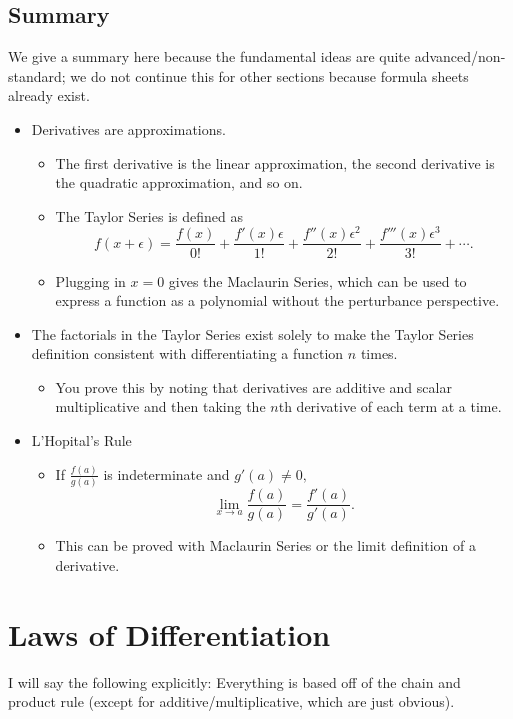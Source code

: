 \documentclass[blue,onecol]{shooting}
\begin{document}
\subsection{Summary}
We give a summary here because the fundamental ideas are quite advanced/non-standard; we do not continue this for other sections because formula sheets already exist. 
\begin{itemize}
\item Derivatives are approximations.
\begin{itemize}
\item The first derivative is the linear approximation, the second derivative is the quadratic approximation, and so on.
\item The Taylor Series is defined as \[f(x+\epsilon)=\frac{f(x)}{0!}+\frac{f'(x)\epsilon}{1!}+\frac{f''(x)\epsilon^2}{2!}+\frac{f'''(x)\epsilon^3}{3!}+\cdots.\]
\item Plugging in $x=0$ gives the Maclaurin Series, which can be used to express a function as a polynomial without the perturbance perspective.
\end{itemize}
\item The factorials in the Taylor Series exist solely to make the Taylor Series definition consistent with differentiating a function $n$ times.
\begin{itemize}
\item You prove this by noting that derivatives are additive and scalar multiplicative and then taking the $n$th derivative of each term at a time.
\end{itemize}
\item L'Hopital's Rule
\begin{itemize}
\item If $\frac{f(a)}{g(a)}$ is indeterminate and $g'(a)\neq 0,$
\[\lim_{x\to a}\frac{f(a)}{g(a)}=\frac{f'(a)}{g'(a)}.\]
\item This can be proved with Maclaurin Series or the limit definition of a derivative.
\end{itemize}
\end{itemize}

\section{Laws of Differentiation}

I will say the following explicitly: Everything is based off of the chain and product rule (except for additive/multiplicative, which are just obvious).
\end{document}

